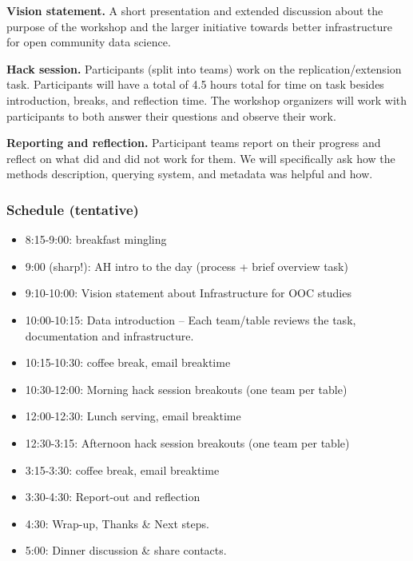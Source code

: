 \textbf{Vision statement.} A short presentation and extended discussion about the purpose of the workshop and the larger initiative towards better infrastructure for open community data science.

\textbf{Hack session.} Participants (split into teams) work on the replication/extension task.  Participants will have a total of 4.5 hours total for time on task besides introduction, breaks, and reflection time.  The workshop organizers will work with participants to both answer their questions and observe their work.

\textbf{Reporting and reflection.} Participant teams report on their progress and reflect on what did and did not work for them.  We will specifically ask how the methods description, querying system, and metadata was helpful and how.

\subsubsection{Schedule (tentative)}
\begin{itemize}
\item 8:15-9:00: breakfast mingling
\item 9:00 (sharp!): AH intro to the day (process + brief overview task)
\item 9:10-10:00: Vision statement about Infrastructure for OOC studies
\item 10:00-10:15: Data introduction -- Each team/table reviews the task, documentation and infrastructure.
\item 10:15-10:30: coffee break, email breaktime
\item 10:30-12:00: Morning hack session breakouts (one team per table)
\item 12:00-12:30: Lunch serving, email breaktime
\item 12:30-3:15: Afternoon hack session breakouts (one team per table)
\item 3:15-3:30: coffee break, email breaktime
\item 3:30-4:30: Report-out and reflection
\item 4:30: Wrap-up, Thanks \& Next steps.
\item 5:00: Dinner discussion \& share contacts.
\end{itemize}
